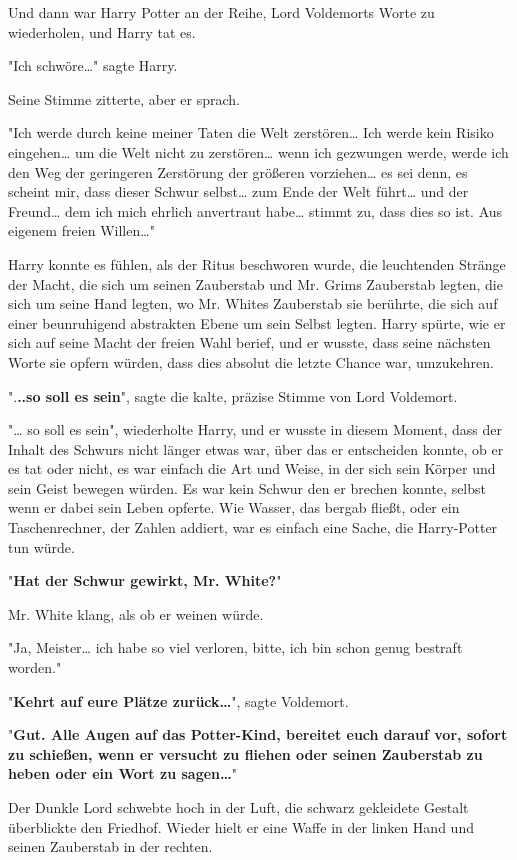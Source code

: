 {Und dann war Harry Potter an der Reihe, Lord Voldemorts Worte zu wiederholen, und Harry tat es.

"Ich schwöre…" sagte Harry.

Seine Stimme zitterte, aber er sprach.

"Ich werde durch keine meiner Taten die Welt zerstören… Ich werde kein Risiko eingehen… um die Welt nicht zu zerstören… wenn ich gezwungen werde, werde ich den Weg der geringeren Zerstörung der größeren vorziehen… es sei denn, es scheint mir, dass dieser Schwur selbst… zum Ende der Welt führt… und der Freund… dem ich mich ehrlich anvertraut habe… stimmt zu, dass dies so ist. Aus eigenem freien Willen…"

Harry konnte es fühlen, als der Ritus beschworen wurde, die leuchtenden Stränge der Macht, die sich um seinen Zauberstab und Mr. Grims Zauberstab legten, die sich um seine Hand legten, wo Mr. Whites Zauberstab sie berührte, die sich auf einer beunruhigend abstrakten Ebene um sein Selbst legten. Harry spürte, wie er sich auf seine Macht der freien Wahl berief, und er wusste, dass seine nächsten Worte sie opfern würden, dass dies absolut die letzte Chance war, umzukehren.

".\textbf{..so soll es sein}", sagte die kalte, präzise Stimme von Lord Voldemort.

"… so soll es sein", wiederholte Harry, und er wusste in diesem Moment, dass der Inhalt des Schwurs nicht länger etwas war, über das er entscheiden konnte, ob er es tat oder nicht, es war einfach die Art und Weise, in der sich sein Körper und sein Geist bewegen würden. Es war kein Schwur den er brechen konnte, selbst wenn er dabei sein Leben opferte. Wie Wasser, das bergab fließt, oder ein Taschenrechner, der Zahlen addiert, war es einfach eine Sache, die Harry-Potter tun würde.

"\textbf{Hat der Schwur gewirkt, Mr. White?}"

Mr. White klang, als ob er weinen würde.

"Ja, Meister… ich habe so viel verloren, bitte, ich bin schon genug bestraft worden."

"\textbf{Kehrt auf eure Plätze zurück…}", sagte Voldemort.

"\textbf{Gut. Alle Augen auf das Potter-Kind, bereitet euch darauf vor, sofort zu schießen, wenn er versucht zu fliehen oder seinen Zauberstab zu heben oder ein Wort zu sagen…}"

Der Dunkle Lord schwebte hoch in der Luft, die schwarz gekleidete Gestalt überblickte den Friedhof. Wieder hielt er eine Waffe in der linken Hand und seinen Zauberstab in der rechten.

}
